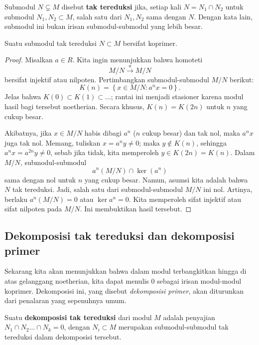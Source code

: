 \begin{definition} 
Submodul $N \subsetneq M$ disebut \textbf{tak tereduksi} jika, setiap kali $N = N_1 \cap N_2$ untuk submodul $N_1,
N_2 \subset M$, salah satu dari $N_1, N_2$ sama dengan $N$. Dengan kata lain, submodul ini bukan
 irisan submodul-submodul yang lebih besar. 
\end{definition} 

\begin{proposition} \label{irrediscoprimary}
Suatu submodul tak tereduksi $N \subset M$ bersifat koprimer.
\end{proposition} 
\begin{proof} 
Misalkan $a \in R$. Kita ingin menunjukkan bahwa homoteti 
\[ M/N \stackrel{a}{\to} M/N  \]
bersifat injektif atau nilpoten.
Pertimbangkan submodul-submodul $M/N$ berikut:
\[ K(n) =  \left\{x \in M/N: a^n x = 0\right\} . \]
Jelas bahwa $K(0) \subset K(1) \subset \dots$; rantai ini menjadi stasioner karena
modul hasil bagi tersebut noetherian.
Secara khusus, $K(n) = K(2n)$ untuk $n$ yang cukup besar. 

Akibatnya, jika $x \in M/N$ habis dibagi $a^n$ ($n$ cukup besar) dan tak nol, maka $a^n x$
juga tak nol. Memang, tuliskan $x = a^n y \neq 0$; maka $y \notin K(n)$, sehingga $a^{n}x =
a^{2n}y \neq 0$, sebab jika tidak, kita memperoleh $y \in K(2n) = K(n)$. Dalam $M/N$, submodul-submodul
\[ a^n(M/N) \cap \ker(a^n)  \]
sama dengan nol untuk $n$ yang cukup besar. Namun, asumsi kita adalah bahwa $N$
tak tereduksi. Jadi, salah satu dari submodul-submodul $M/N$ ini nol. Artinya, berlaku
$a^n(M/N) = 0$ atau $\ker a^n = 0$. Kita memperoleh sifat injektif atau sifat nilpoten pada
$M/N$. Ini membuktikan hasil tersebut.
\end{proof} 
 
\subsection{Dekomposisi tak tereduksi dan dekomposisi primer}

Sekarang kita akan menunjukkan bahwa dalam modul terbangkitkan hingga di atas gelanggang noetherian,
kita dapat menulis $0$ sebagai irisan modul-modul koprimer. Dekomposisi ini,
yang disebut \emph{dekomposisi primer}, akan diturunkan dari penalaran yang sepenuhnya
umum.

\begin{definition} 
Suatu \textbf{dekomposisi tak tereduksi} dari modul $M$ adalah penyajian
$N_1 \cap N_2 \dots \cap N_k  = 0$, dengan $N_i \subset M$ merupakan submodul-submodul tak tereduksi
dalam dekomposisi tersebut.
\end{definition} 

